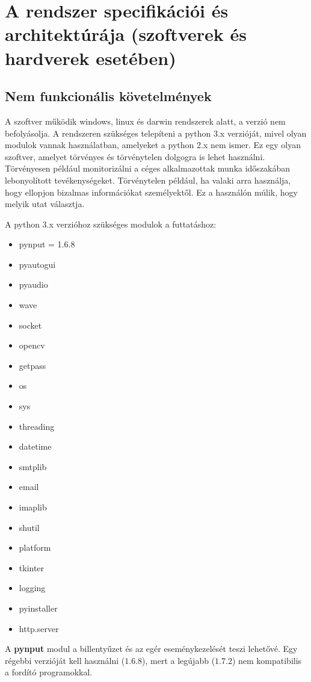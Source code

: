 \documentclass[a4paper, 11pt]{article}
\begin{document}
\section{A rendszer specifikációi és architektúrája (szoftverek és hardverek esetében)}\label{sec:specs_and_arch}

\subsection{Nem funkcionális követelmények}
A szoftver működik windows, linux és darwin rendszerek alatt, a verzió nem befolyásolja. A rendszeren szükséges telepíteni a python 3.x verzióját, mivel olyan modulok vannak használatban, amelyeket a python 2.x nem ismer. Ez egy olyan szoftver, amelyet törvényes és törvénytelen dolgogra is lehet használni. Törvényesen például monitorizálni a céges alkalmazottak munka időszakában lebonyolított tevékenységeket. Törvénytelen például, ha valaki arra használja, hogy ellopjon bizalmas információkat személyektől. Ez a használón múlik, hogy melyik utat választja.

A python 3.x verzióhoz szükséges modulok a futtatáshoz:
\begin{multicols}{2}
\begin{itemize}
\item pynput = 1.6.8
\item pyautogui
\item pyaudio
\item wave
\item socket
\item opencv
\item getpass
\item os
\item sys
\item threading
\item datetime
\item smtplib
\item email
\item imaplib
\item shutil
\item platform
\item tkinter
\item logging
\item pyinstaller
\item http.server
\end{itemize}
\end{multicols}
\cleardoublepage
A \textbf{pynput} modul a billentyűzet és az egér eseménykezelését teszi lehetővé. Egy régebbi verzióját kell használni ($1.6.8$), mert a legújabb ($1.7.2$) nem kompatibilis a fordító programokkal.
\end{document}
